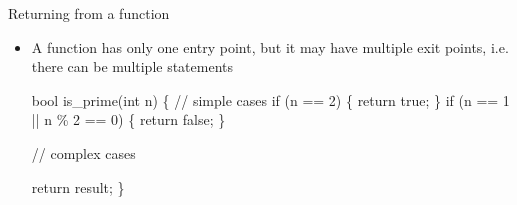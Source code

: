 \begin{frame}[fragile]{Returning from a function \insertcontinuationtext}

  \begin{itemize}
  \item A function has only one entry point, but it may have multiple exit
    points, i.e. there can be multiple  statements

    \begin{codeblock}
bool is_prime(int n) \{
  // simple cases
  if (n == 2) \{ \alert{return} true; \}
  if (n == 1 || n \% 2 == 0) \{ \alert{return} false; \}

  // complex cases
  \ddd

  \alert{return} result;
\}\end{codeblock}

    \end{itemize}

\end{frame}


